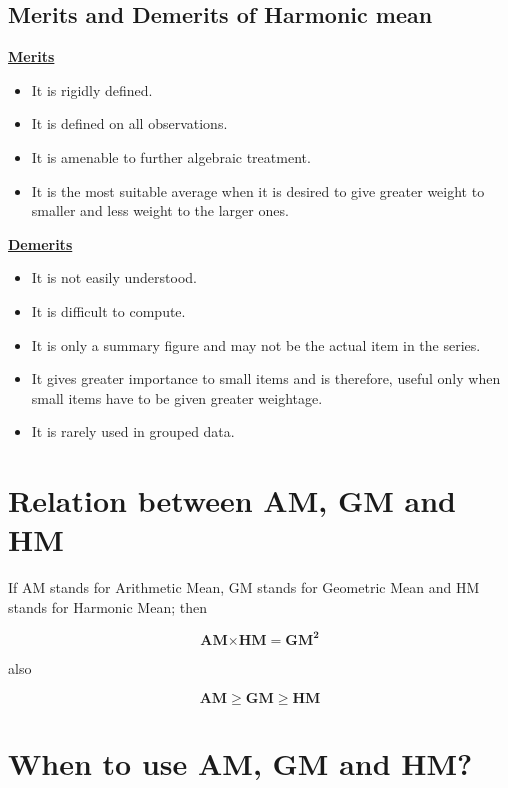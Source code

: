 \documentclass[
]{book}
\begin{document}
\hypertarget{merits-and-demerits-of-harmonic-mean}{%
\subsection{Merits and Demerits of Harmonic mean}\label{merits-and-demerits-of-harmonic-mean}}

\ul{\textbf{Merits}}

\begin{itemize}
\item
  It is rigidly defined.
\item
  It is defined on all observations.
\item
  It is amenable to further algebraic treatment.
\item
  It is the most suitable average when it is desired to give greater
  weight to smaller and less weight to the larger ones.
\end{itemize}

\ul{\textbf{Demerits}}

\begin{itemize}
\item
  It is not easily understood.
\item
  It is difficult to compute.
\item
  It is only a summary figure and may not be the actual item in the
  series.
\item
  It gives greater importance to small items and is therefore, useful
  only when small items have to be given greater weightage.
\item
  It is rarely used in grouped data.
\end{itemize}

\hypertarget{relation-between-am-gm-and-hm}{%
\section{Relation between AM, GM and HM}\label{relation-between-am-gm-and-hm}}

If AM stands for Arithmetic Mean, GM stands for Geometric Mean and HM
stands for Harmonic Mean; then

\[\mathbf{\text{AM}}\mathbf{\times}\mathbf{\text{HM}}\mathbf{=}\mathbf{\text{GM}}^{\mathbf{2}}\]

also

\[\mathbf{AM \geq GM \geq HM}\]

\hypertarget{when-to-use-am-gm-and-hm}{%
\section{When to use AM, GM and HM?}\label{when-to-use-am-gm-and-hm}}
\end{document}
